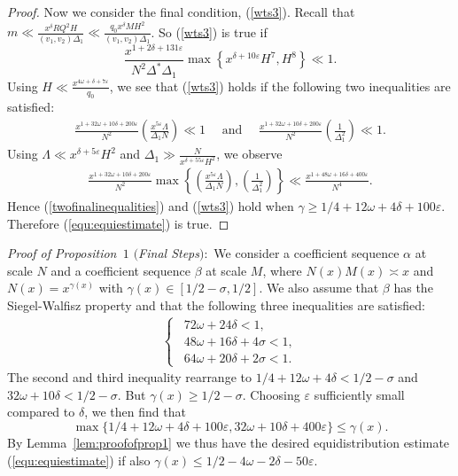 \documentclass{amsart}
\numberwithin{equation}{section}
\begin{document}
\begin{proof}
\vspace{3mm}
Now we consider the final condition, (\ref{wts3}). Recall that  $m \ll \frac{x^\delta RQ^2 H}{(v_1,v_2)\Delta_1}\ll \frac{q_0 x^\delta M H^2}{(v_1,v_2)\Delta_1}$. So (\ref{wts3}) is true if 
$$\frac{ x^{1+2\delta+131\varepsilon } }{N^2\Delta^*\Delta_1} \max\left\{x^{\delta+10\varepsilon}H^7,H^8\right\}\ll  1.$$
 Using $
 H \ll \tfrac{x^{4\omega+\delta+7\varepsilon}}{q_0}$, we see that (\ref{wts3}) holds if the following two inequalities are satisfied: 
 \begin{align} \label{twofinalinequalities}
 \frac{x^{1+32\omega+  10\delta+200\varepsilon}   }{N^2} \left(\frac{ x^{5\varepsilon}\Lambda}{\Delta_1N}\right)  \ll 1 \quad \mbox{ and } \quad  \frac{x^{1+32\omega+  10\delta+200\varepsilon}   }{N^2} \left(\frac{1}{\Delta_1^2}\right) \ll  1.
\end{align}
Using  $\Lambda \ll x^{\delta+5\varepsilon} H^2$ and  $\Delta_1 \gg \frac{N}{x^{\delta+55\varepsilon}H^2}$, we observe
\begin{align*}
 \frac{x^{1+32\omega+  10\delta+200\varepsilon}   }{N^2} \max\left\{\left(\frac{ x^{5\varepsilon}\Lambda}{\Delta_1N}\right),  \left(\frac{1}{\Delta_1^2}\right)\right\}  \ll  \frac{x^{1+48\omega+  16\delta+400\varepsilon}   }{N^4}.
\end{align*}
Hence (\ref{twofinalinequalities}) and (\ref{wts3}) hold when $\gamma \geq 1/4+12\omega+4\delta+100\varepsilon$. 
  Therefore (\ref{equ:equiestimate}) is true. 
\end{proof}


\textit{Proof of Proposition~$1$ $($Final Steps$):$} We consider a coefficient sequence $\alpha$ at scale $N$ and a coefficient sequence $\beta$ at scale $M$, where $N(x)M(x) \asymp x$ and $N(x)= x^{\gamma(x)}$ with $\gamma(x) \in [1/2-\sigma,1/2]$. We also assume that $\beta$ has the Siegel-Walfisz property and that the following three inequalities are satisfied:
\begin{align} \label{assumptions}
\begin{cases}
\,\,\, 72\omega + 24 \delta < 1, \\
\,\,\, 48 \omega + 16\delta + 4\sigma <1, \\ 
\,\,\, 64 \omega +20\delta+2\sigma<1.
\end{cases}
\end{align}
The second and third inequality rearrange to $1/4+12 \omega + 4\delta <1/2-\sigma $ and $32 \omega +10\delta<1/2-\sigma$. But $\gamma(x) \geq 1/2-\sigma$. Choosing $\varepsilon$ sufficiently small compared to $\delta$, we then find that 
$$\max\{1/4+12 \omega + 4\delta+100\varepsilon, 32 \omega +10\delta+400\varepsilon\}\leq \gamma(x).$$  
By Lemma~\ref{lem:proofofprop1} we thus have the desired equidistribution estimate (\ref{equ:equiestimate}) if also $\gamma(x) \leq 1/2-4\omega-2\delta-50\varepsilon$. 
\end{document}
